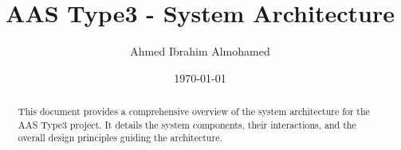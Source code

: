 \documentclass[12pt,a4paper]{article}
\title{AAS Type3 - System Architecture}
\author{Ahmed Ibrahim Almohamed}
\date{\today}
\begin{document}
\maketitle



\begin{abstract}
  This document provides a comprehensive overview of the system architecture for the AAS Type3 project. It details the system components, their interactions, and the overall design principles guiding the architecture.
\end{abstract}
\newpage
\tableofcontents

\newpage


\newpage


\newpage


\newpage




\end{document}
